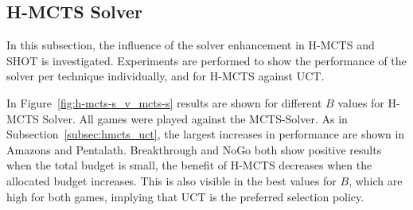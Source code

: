 \documentclass{kecsmstr}
\begin{document}
\subsection{H-MCTS Solver}
\label{subsec:hmcts_solver}

In this subsection, the influence of the solver enhancement in H-MCTS and SHOT is investigated. Experiments are performed to show the performance of the solver per technique individually, and for H-MCTS against UCT.



In Figure~\ref{fig:h-mcts-s_v_mcts-s} results are shown for different $B$ values for H-MCTS Solver. All games were played against the MCTS-Solver. As in Subsection~\ref{subsec:hmcts_uct}, the largest increases in performance are shown in Amazons and Pentalath. Breakthrough and NoGo both show positive results when the total budget is small, the benefit of H-MCTS decreases when the allocated budget increases. This is also visible in the best values for $B$, which are high for both games, implying that UCT is the preferred selection policy.
\end{document}
